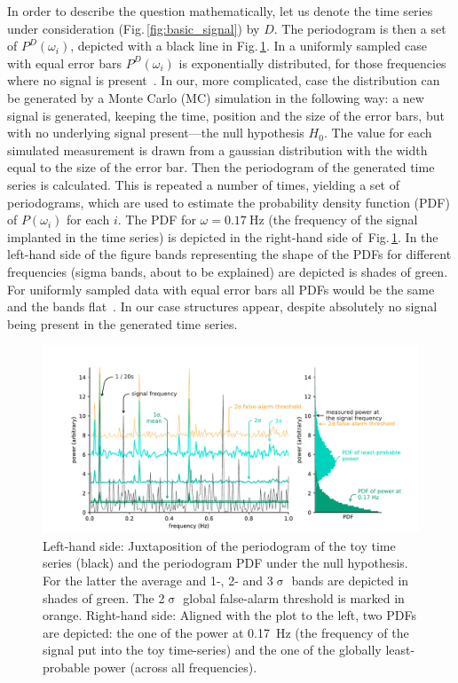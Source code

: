 In order to describe the question mathematically, let us denote the time series under consideration (Fig.\,\ref{fig:basic_signal}) by $D$.
The periodogram is then a set of $P^D(\omega_i)$, depicted with a black line in Fig.\,\ref{fig:basic_detection}.
In a uniformly sampled case with equal error bars $P^D(\omega_i)$ is exponentially distributed, for those frequencies where no signal is present~\cite{Scargle1982}.
In our, more complicated, case the distribution can be generated by a Monte Carlo (MC) simulation in the following way: a new signal is generated, keeping the time, position and the size of the error bars, but with no underlying signal present---the null hypothesis $H_0$.
The value for each simulated measurement is drawn from a gaussian distribution with the width equal to the size of the error bar.
Then the periodogram of the generated time series is calculated.
This is repeated a number of times, yielding a set of periodograms, which are used to estimate the probability density function (PDF) of $P(\omega_i)$ for each $i$.
The PDF for $\omega = \SI{0.17}{\hertz}$ (the frequency of the signal implanted in the time series) is depicted in the right-hand side of~Fig.\,\ref{fig:basic_detection}.
In the left-hand side of the figure bands representing the shape of the PDFs for different frequencies (sigma bands, about to be explained) are depicted is shades of green.
For uniformly sampled data with equal error bars all PDFs would be the same and the bands flat~\cite{Scargle1982}.
In our case structures appear, despite absolutely no signal being present in the generated time series.

\begin{figure}
  \centering \includegraphics[width=\linewidth]{gfx/axions/basic_detection.pdf}
  \caption{Left-hand side: Juxtaposition of the periodogram of the toy time series (black) and the periodogram PDF under the null hypothesis.
  For the latter the average and 1-, 2- and 3$\upsigma$ bands are depicted in shades of green.
  The 2$\upsigma$ global false-alarm threshold is marked in orange.
  Right-hand side: Aligned with the plot to the left, two PDFs are depicted: the one of the power at \SI{0.17}{\hertz} (the frequency of the signal put into the toy time-series) and the one of the globally least-probable power (across all frequencies).}\label{fig:basic_detection}
\end{figure}

